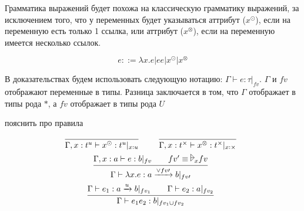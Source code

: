 Грамматика выражений будет похожа на классическую грамматику выражений, за исключением того,
что у переменных будет указываться аттрибут ($x^\odot$), если на переменную есть только 1 ссылка,
или аттрибут ($x^\otimes$), если на переменную имеется несколько ссылок.
\begin{bnf}
\[
	e ::= \lambda x.e | ee | x^\odot | x^\otimes
\]
\end{bnf}%
В доказательствах будем использовать следующую нотацию: $\Gamma \vdash e : \tau |_{fv}$.
$\Gamma$ и $fv$ отображают переменные в типы. 
Разница заключается в том, что $\Gamma$ отображает в типы рода $*$,
а $fv$ отображает в типы рода $U$

\todo пояснить про правила
\begin{@empty}
\inferspacing
\begin{gather*}
	\infer[]{\Gamma, x : t^u \vdash x^\odot : t^u |_{x:u}}{} \qquad
	\infer[]{\Gamma, x : t^\times \vdash x^\otimes : t^\times |_{x:\times}}{} \\
	\infer[]
		{\Gamma \vdash \lambda x.e : a \xrightarrow{\vee fv\prime} b |_{fv\prime}}
		{\Gamma, x : a \vdash e : b |_{fv} && fv' \equiv \fuck_x fv} \\
	\infer[]
		{\Gamma \vdash e_1e_2 : b |_{fv_1 \cup fv_2}}
		{\Gamma \vdash e_1 : a \xrightarrow{u} b |_{fv_1} \qquad \Gamma \vdash e_2 : a |_{fv_2}}
\end{gather*}
\end{@empty}
